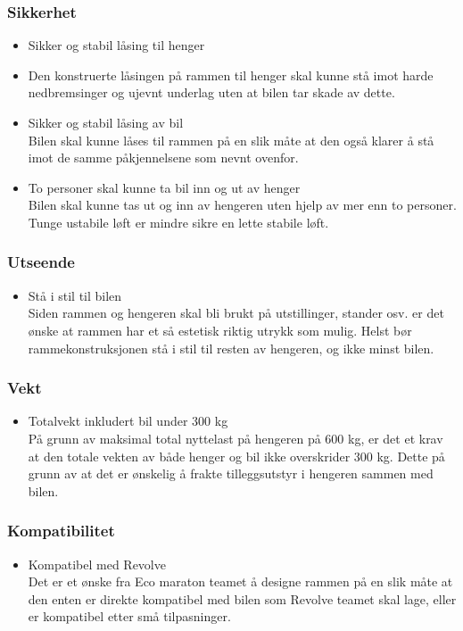 \subsubsection{Sikkerhet}
\begin{itemize}
\item Sikker og stabil låsing til henger \\
\item Den konstruerte låsingen på rammen til henger skal kunne stå imot harde nedbremsinger og ujevnt underlag uten at bilen tar skade av dette.  
\item Sikker og stabil låsing av bil \\
Bilen skal kunne låses til rammen på en slik måte at den også klarer å stå imot de samme påkjennelsene som nevnt ovenfor.
\item To personer skal kunne ta bil inn og ut av henger \\
Bilen skal kunne tas ut og inn av hengeren uten hjelp av mer enn to personer. Tunge ustabile løft er mindre sikre en lette stabile løft.  
\end{itemize}
\subsubsection{Utseende}
\begin{itemize}
\item Stå i stil til bilen \\
Siden rammen og hengeren skal bli brukt på utstillinger, stander osv. er det ønske at rammen har et så estetisk riktig utrykk som mulig. Helst bør rammekonstruksjonen stå i stil til resten av hengeren, og ikke minst bilen. 
\end{itemize}
\subsubsection{Vekt}
\begin{itemize}
\item Totalvekt inkludert bil under 300 kg \\
På grunn av maksimal total nyttelast på hengeren på 600 kg, er det et krav at den totale vekten av både henger og bil ikke overskrider 300 kg. Dette på grunn av at det er ønskelig å frakte tilleggsutstyr i hengeren sammen med bilen.  
\end{itemize}
\subsubsection{Kompatibilitet}
\begin{itemize}
\item Kompatibel med Revolve \\
Det er et ønske fra Eco maraton teamet å designe rammen på en slik måte at den enten er direkte kompatibel med bilen som Revolve teamet skal lage, eller er kompatibel etter små tilpasninger. 
\end{itemize}
